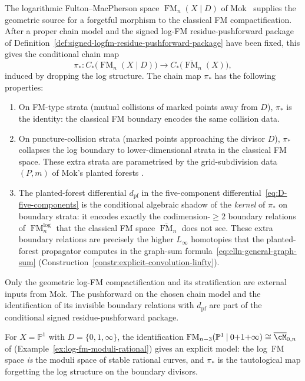 \begin{construction}
\label{constr:log-fm-chain-map}
The logarithmic Fulton--MacPherson space
$\operatorname{FM}_n(X \mathbin{|} D)$ of
Mok~\cite[Theorem~3.3.1]{Mok25} supplies the geometric source for a
forgetful morphism to the classical FM compactification. After a
proper chain model and the signed log-FM residue-pushforward package
of Definition~\ref{def:signed-logfm-residue-pushforward-package} have
been fixed, this gives the conditional chain map
\[
\pi_*\colon
C_*\bigl(\operatorname{FM}_n(X \mathbin{|} D)\bigr)
\longrightarrow
C_*\bigl(\overline{\operatorname{FM}}_n(X)\bigr),
\]
induced by dropping the log structure.
The chain map $\pi_*$ has the following properties:
\begin{enumerate}[label=\textup{(\roman*)}]
\item On FM-type strata \textup{(}mutual collisions of marked
 points away from $D$\textup{)}, $\pi_*$ is the identity: the
 classical FM boundary encodes the same collision data.
\item On puncture-collision strata \textup{(}marked points
 approaching the divisor $D$\textup{)}, $\pi_*$ collapses the
 log boundary to lower-dimensional strata in the classical FM
 space. These extra strata are parametrised by the
 grid-subdivision data $(P, m)$ of Mok's planted forests
 \cite[Definition~3.1.5]{Mok25}.
\item The planted-forest differential $d_{\mathrm{pf}}$ in the
 five-component differential~\eqref{eq:D-five-components} is the
 conditional algebraic shadow of the \emph{kernel} of $\pi_*$ on boundary
 strata: it encodes exactly the codimension-${\geq}2$ boundary
 relations of $\operatorname{FM}_n^{\mathrm{log}}$ that the
 classical FM space $\overline{\operatorname{FM}}_n$ does not see.
 These extra boundary relations are precisely the higher
 $L_\infty$ homotopies that the planted-forest propagator
 computes in the graph-sum formula~\eqref{eq:elln-general-graph-sum}
 \textup{(}Construction~\textup{\ref{constr:explicit-convolution-linfty})}.
\end{enumerate}
Only the geometric log-FM compactification and its stratification are
external inputs from Mok. The pushforward on the chosen chain model
and the identification of its invisible boundary relations with
$d_{\mathrm{pf}}$ are part of the conditional signed
residue-pushforward package.

For $X = \mathbb{P}^1$ with $D = \{0, 1, \infty\}$, the identification
$\operatorname{FM}_{n-3}(\mathbb{P}^1 \mathbin{|} 0{+}1{+}\infty)
\cong \overline{\cM}_{0,n}$
of \cite[\S3.4.1]{Mok25}
 \textup{(}Example~\textup{\ref{ex:log-fm-moduli-rational})}
 gives an explicit model: the log~FM space
\emph{is} the moduli space of stable rational curves, and $\pi_*$ is
the tautological map forgetting the log structure on the boundary
divisors.
\end{construction}

